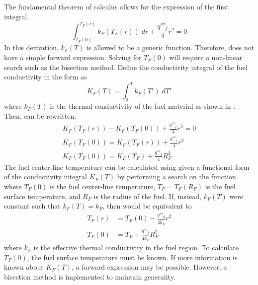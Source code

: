       The fundamental theorem of calculus allows for the expression of the first
      integral.
      \begin{equation}
        \label{eq:tcl_integral}
        \int_{T_F(0)}^{T_F(r)} k_F(T_F(r)) \; dr + \frac{q'''_j}{4} r^2 = 0
      \end{equation}
      In this derivation, $k_F(T)$ is allowed to be a generic function. 
      Therefore,  does not have a simple forward 
      expression. Solving for $T_F(0)$ will require a non-linear search such as
      the bisection method. Define the conductivity integral of the fuel
      conductivity in the form as
      \begin{equation}
        \label{eq:conductivity_integral}
        K_F(T) = \int_0^T k_F(T') \; dT'
      \end{equation}
      where $k_F(T)$ is the thermal conductivity of the fuel material as shown
      in . Then,  can be rewritten.
      \begin{gather}
        K_F(T_F(r)) - K_F(T_F(0)) + \frac{q'''_j}{4} r^2 = 0 \\
        \label{eq:tfuel_r}
        K_F(T_F(0)) = K_F(T_F(r)) + \frac{q'''_j}{4} r^2 \\
        \label{eq:tcl_conductivity_integral}
        K_F(T_F(0)) = K_F(T_F) + \frac{q'''_j}{4} R_F^2
      \end{gather}
      The fuel center-line temperature can be calculated using
       given a functional form of the
      conductivity integral $K_F(T)$ by performing a search on the function
      where $T_F(0)$ is the fuel center-line temperature, $T_F=T_F(R_F)$ is the
      fuel surface temperature, and $R_F$ is the radius of the fuel.
      If, instead, $k_F(T)$ were constant such that $k_F(T) = k_F$, then
       would be equivalent to 
      \begin{align}
        \label{eq:tfr}
        T_F(r) &= T_F(0) - \frac{q'''_g}{4 \overline{k_F}} r^2 \\
        \label{eq:tcl_constant_kfuel}
        T_F(0) &= T_F + \frac{q'''_j}{4 \overline{k_F}} R_F^2
      \end{align}
      where $\overline{k_F}$ is the effective thermal conductivity in the fuel
      region.
      To calculate $T_F(0)$, the fuel surface temperature must be known.
      If more information is known about $K_F(T)$, a forward expression
      may be possible. However, a bisection method is implemented to maintain
      generality.

